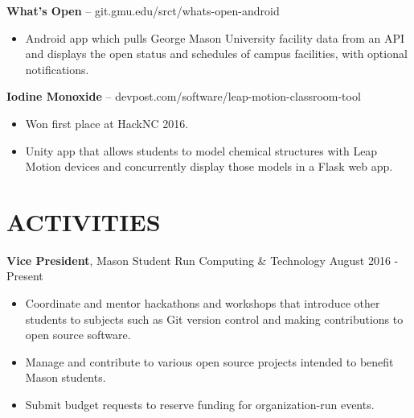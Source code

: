 \documentclass[11pt]{res} %
\begin{document}
\begin{resume}
\textbf{What's Open} -- git.gmu.edu/srct/whats-open-android \smallskip
\begin{itemize}
\item Android app which pulls George Mason University facility data from an API and displays the open status and schedules of campus facilities, with optional notifications.
\end{itemize}

\vspace{-8pt}\textbf{Iodine Monoxide} -- devpost.com/software/leap-motion-classroom-tool \smallskip
\begin{itemize}
\item Won first place at HackNC 2016.
\item Unity app that allows students to model chemical structures with Leap Motion devices and concurrently display those models in a Flask web app.
\end{itemize}

\vspace{-15pt}
\noindent\makebox[\linewidth]{\rule{\textwidth}{1pt}}


\vspace{-10pt}\section{ACTIVITIES} \smallskip

\textbf{Vice President}, Mason Student Run Computing \& Technology \hfill August 2016 - Present\smallskip
\begin{itemize}
\item Coordinate and mentor hackathons and workshops that introduce other students to subjects such as Git version control and making contributions to open source software.
\item Manage and contribute to various open source projects intended to benefit Mason students.
\item Submit budget requests to reserve funding for organization-run events.
\end{itemize}


\end{resume}
\end{document}
